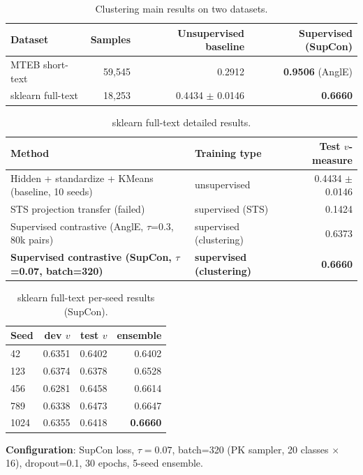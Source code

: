 \documentclass[11pt]{article}
\begin{document}
\begin{table}[h]
\centering
\begin{tabular}{lrrr}
\toprule
Dataset & Samples & Unsupervised baseline & Supervised (SupCon) \\
\midrule
MTEB short-text & 59,545 & 0.2912 & \textbf{0.9506} (AnglE) \\
sklearn full-text & 18,253 & 0.4434 $\pm$ 0.0146 & \textbf{0.6660} \\
\bottomrule
\end{tabular}
\caption{Clustering main results on two datasets.}
\end{table}

\begin{table}[h]
\centering
\small
\begin{tabular}{llr}
\toprule
Method & Training type & Test $v$-measure \\
\midrule
Hidden + standardize + KMeans (baseline, 10 seeds) & unsupervised &
0.4434 $\pm$ 0.0146 \\
STS projection transfer (failed) & supervised (STS) & 0.1424 \\
Supervised contrastive (AnglE, $\tau$=0.3, 80k pairs) & supervised
(clustering) & 0.6373 \\
\textbf{Supervised contrastive (SupCon, $\tau$=0.07, batch=320)} &
\textbf{supervised (clustering)} & \textbf{0.6660} \\
\bottomrule
\end{tabular}
\caption{sklearn full-text detailed results.}
\end{table}

\begin{table}[h]
\centering
\begin{tabular}{lrrr}
\toprule
Seed & dev $v$ & test $v$ & ensemble \\
\midrule
42 & 0.6351 & 0.6402 & 0.6402 \\
123 & 0.6374 & 0.6378 & 0.6528 \\
456 & 0.6281 & 0.6458 & 0.6614 \\
789 & 0.6338 & 0.6473 & 0.6647 \\
1024 & 0.6355 & 0.6418 & \textbf{0.6660} \\
\bottomrule
\end{tabular}
\caption{sklearn full-text per-seed results (SupCon).}
\end{table}

\textbf{Configuration}: SupCon loss, $\tau=0.07$, batch=320 (PK sampler, 20
classes $\times$ 16), dropout=0.1, 30 epochs, 5-seed ensemble.
\end{document}
